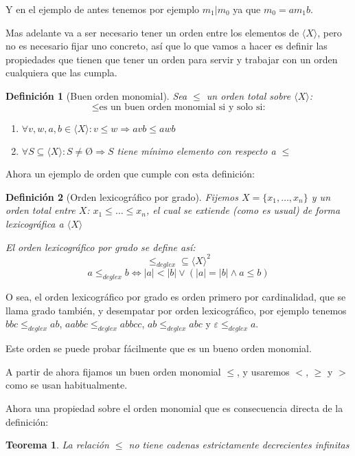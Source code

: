 \documentclass{amsbook} %
\theoremstyle{customstyle}
\newtheorem{definition}{Definición}[section]
\newtheorem{theorem}{Teorema}[section]
\begin{document}
Y en el ejemplo de antes tenemos por ejemplo $m_1 | m_0$ ya que $m_0 = a m_1 b$.

Mas adelante va a ser necesario tener un orden entre los elementos de $⟨X⟩$, pero no es necesario fijar uno concreto, así que lo que vamos a hacer es definir las propiedades que tienen que tener un orden para servir y trabajar con un orden cualquiera que las cumpla.

\begin{definition}[Buen orden monomial]
Sea $≤$ un orden total sobre $⟨X⟩$: %
\[ ≤ \text{es un buen orden monomial si y solo si:} \] %
\begin{enumerate}[label = (\alph*)]
\item $∀v, w, a, b ∈ ⟨X⟩ : v ≤ w ⇒ avb ≤ awb$

\item $∀S ⊆ ⟨X⟩ : S ≠ Ø ⇒ S$ tiene mínimo elemento con respecto a $≤$
\end{enumerate}
\end{definition}

Ahora un ejemplo de orden que cumple con esta definición:

\begin{definition}[Orden lexicográfico por grado]
Fijemos $X = \{x_1, …, x_n\}$ y un orden total entre $X$: $x_1 ≤ … ≤ x_n$, el cual se extiende (como es usual) de forma lexicográfica a $⟨X⟩$

El orden lexicográfico por grado se define así:
\[ ≤_{deglex} ⊆ ⟨X⟩^2 \] %
\[ a ≤_{deglex} b ⇔ |a| < |b| ∨ (|a| = |b| ∧ a ≤ b) \]
\end{definition}

O sea, el orden lexicográfico por grado es orden primero por cardinalidad, que se llama grado también, y desempatar por orden lexicográfico, por ejemplo tenemos $bbc ≤_{deglex} ab$, $aabbc ≤_{deglex} abbcc$, $ab ≤_{deglex} abc$ y $ε ≤_{deglex} a$.

Este orden se puede probar fácilmente que es un bueno orden monomial.

A partir de ahora fijamos un buen orden monomial $≤$, y usaremos $<$, $≥$ y $>$ como se usan habitualmente.

Ahora una propiedad sobre el orden monomial que es consecuencia directa de la definición:

\begin{theorem}\label{thm:≤ no cadenas dec inf}
La relación $≤$ no tiene cadenas estrictamente decrecientes infinitas
\end{theorem}
\end{document}
